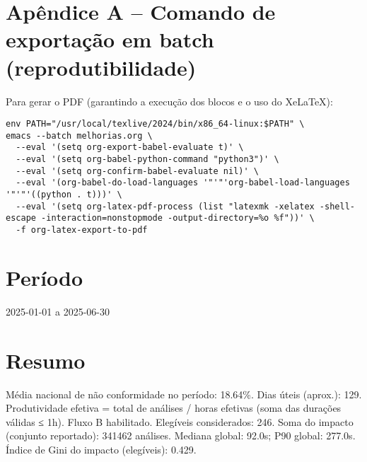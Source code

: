\documentclass[11pt]{article}
\begin{document}
\section{Apêndice A – Comando de exportação em batch (reprodutibilidade)}
\label{sec:orga396f7f}
Para gerar o PDF (garantindo a execução dos blocos e o uso do XeLaTeX):

\begin{verbatim}
env PATH="/usr/local/texlive/2024/bin/x86_64-linux:$PATH" \
emacs --batch melhorias.org \
  --eval '(setq org-export-babel-evaluate t)' \
  --eval '(setq org-babel-python-command "python3")' \
  --eval '(setq org-confirm-babel-evaluate nil)' \
  --eval '(org-babel-do-load-languages '"'"'org-babel-load-languages '"'"'((python . t)))' \
  --eval '(setq org-latex-pdf-process (list "latexmk -xelatex -shell-escape -interaction=nonstopmode -output-directory=%o %f"))' \
  -f org-latex-export-to-pdf
\end{verbatim}

\section{Período}
\label{sec:org7ead1c8}
2025-01-01 a 2025-06-30

\section{Resumo}
\label{sec:org2690462}
Média nacional de não conformidade no período: 18.64\%.
Dias úteis (aprox.): 129.
Produtividade efetiva = total de análises / horas efetivas (soma das durações válidas ≤ 1h).
Fluxo B habilitado. Elegíveis considerados: 246.
Soma do impacto (conjunto reportado): 341462 análises.
Mediana global: 92.0s; P90 global: 277.0s.
Índice de Gini do impacto (elegíveis): 0.429.
\end{document}
